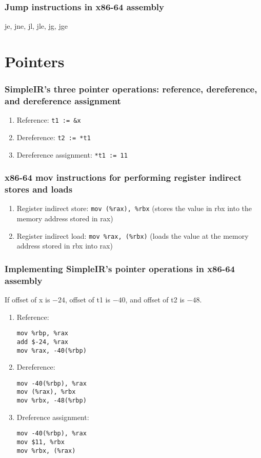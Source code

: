 \documentclass{article}
\newcommand{\inlinecode}[1]{\colorbox{gray!20}{\texttt{#1}}}
\begin{document}
\subsubsection*{Jump instructions in x86-64 assembly}

je, jne, jl, jle, jg, jge

\section*{Pointers}

\subsubsection*{SimpleIR's three pointer operations: reference, dereference, and dereference assignment}

\begin{enumerate}
    \item Reference: \inlinecode{t1 := \&x}
    \item Dereference: \inlinecode{t2 := *t1}
    \item Dereference assignment: \inlinecode{*t1 := 11}
\end{enumerate}

\subsubsection*{x86-64 mov instructions for performing register indirect stores and loads}

\begin{enumerate}
    \item Register indirect store: \inlinecode{mov (\%rax), \%rbx} (stores the value in rbx into the memory address stored in rax)
    \item Register indirect load: \inlinecode{mov \%rax, (\%rbx)} (loads the value at the memory address stored in rbx into rax)
\end{enumerate}

\subsubsection*{Implementing SimpleIR's pointer operations in x86-64 assembly}

If offset of x is $-24$, offset of t1 is $-40$, and offset of t2 is $-48$.

\begin{enumerate}
    \item Reference:
\begin{verbatim}
mov %rbp, %rax
add $-24, %rax
mov %rax, -40(%rbp)
\end{verbatim}
    \item Dereference:
\begin{verbatim}
mov -40(%rbp), %rax
mov (%rax), %rbx
mov %rbx, -48(%rbp)
\end{verbatim}
    \item Dreference assignment:
\begin{verbatim}
mov -40(%rbp), %rax
mov $11, %rbx
mov %rbx, (%rax)
\end{verbatim}
\end{enumerate}
\end{document}
